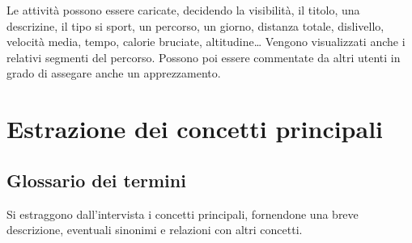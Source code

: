 \documentclass[12pt]{report}
\begin{document}
Le attività possono essere caricate, decidendo la visibilità, il titolo, una descrizine, il tipo si sport, 
un percorso, un giorno, distanza totale, dislivello, velocità media, tempo, calorie bruciate, altitudine\dots 
Vengono visualizzati anche i relativi segmenti del percorso. Possono poi essere commentate da altri 
utenti in grado di assegare anche un apprezzamento.

\section{Estrazione dei concetti principali}

\subsection*{Glossario dei termini}
Si estraggono dall'intervista i concetti principali, fornendone una breve descrizione, eventuali sinonimi e
relazioni con altri concetti.
\end{document}
